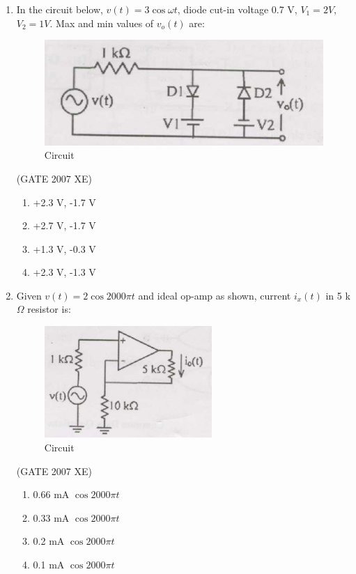 \documentclass[journal,cmex10]{IEEEtran}
\theoremstyle{remark}
\numberwithin{equation}{enumi}
\numberwithin{figure}{enumi}
\begin{document}
\begin{enumerate}
    \item In the circuit below, $v(t) = 3\cos \omega t$, diode cut-in voltage 0.7 V, $V_1 = 2V$, $V_2=1V$. Max and min values of $v_o(t)$ are:
    \begin{figure}[htbp]
  \centering
  \includegraphics[width=0.6\columnwidth]{figs/C/fig9.png}
  \caption{Circuit}
  \label{fig:C/fig9.png}
\end{figure}
    \hfill{(GATE 2007 XE)}
    \begin{multicols}{4}
    \begin{enumerate}
        \item +2.3 V, -1.7 V
        \item +2.7 V, -1.7 V
        \item +1.3 V, -0.3 V
        \item +2.3 V, -1.3 V
    \end{enumerate}
    \end{multicols}

\newpage

    \item Given $v(t) = 2 \cos 2000 \pi t$ and ideal op-amp as shown, current $i_x(t)$ in 5 k$\Omega$ resistor is:
    \begin{figure}[htbp]
  \centering
  \includegraphics[width=0.6\textwidth]{figs/C/fig10.png}
  \caption{Circuit}
  \label{fig:C/fig10.png}
\end{figure}

    \hfill{(GATE 2007 XE)}
    \begin{multicols}{2}
    \begin{enumerate}
        \item 0.66 mA $\cos 2000 \pi t$
        \item 0.33 mA $\cos 2000 \pi t$
        \item 0.2 mA $\cos 2000 \pi t$
        \item 0.1 mA $\cos 2000 \pi t$
    \end{enumerate}
    \end{multicols}
    


\end{enumerate}
\end{document}
